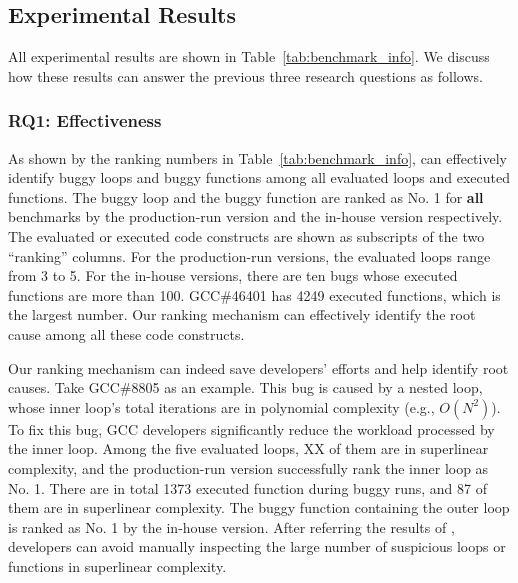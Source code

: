 \subsection{Experimental Results}
\label{sec:results}

All experimental results are shown in Table~\ref{tab:benchmark_info}.
We discuss how these results can answer 
the previous three research questions as follows.

\subsubsection{RQ1: Effectiveness}
As shown by the ranking numbers in Table~\ref{tab:benchmark_info},
\Tool can effectively identify buggy loops and buggy functions 
among all evaluated loops and executed functions.
The buggy loop and the buggy function are ranked as No. 1 for \textbf{all}
benchmarks by the production-run version and the in-house version respectively. 
 The evaluated or executed code constructs are shown as subscripts of 
the two ``ranking'' columns. 
For the production-run versions, the evaluated loops range from 3 to 5.
For the in-house versions, there are ten bugs whose executed functions are more than 
100.  GCC\#46401 has 4249 executed functions, 
which is the largest number.  
Our ranking mechanism can effectively identify the 
root cause among all these code constructs.



Our ranking mechanism can indeed save developers' efforts 
and help identify root causes. 
Take GCC\#8805 as an example.
This bug is caused by a nested loop, 
whose inner loop's total iterations are in polynomial complexity (e.g., $O(N^2)$).
To fix this bug, GCC developers significantly reduce 
the workload processed by the inner loop. 
Among the five evaluated loops, {\color{red} XX} of them are in superlinear complexity, 
and the production-run version successfully rank the inner loop as No. 1.
There are in total 1373 executed function during buggy runs,
and 87 of them are in superlinear complexity. 
The buggy function containing the outer loop is ranked as No. 1 
by the in-house version. 
After referring the results of \Tool, 
developers can avoid manually inspecting the large number of  
suspicious loops or functions in superlinear complexity. 

